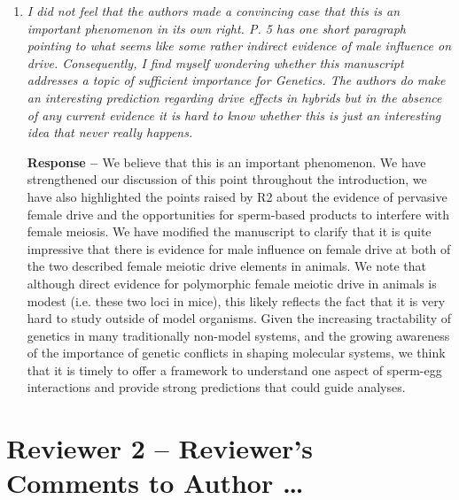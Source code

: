 \documentclass[12pt,letterpaper]{article}
\begin{document}
\begin{enumerate}
\item
\begin{singlespace}
\emph{I did not feel that the authors made a convincing case that this is an
important phenomenon in its own right.  P. 5 has one short paragraph pointing to
what seems like some rather indirect evidence of male influence on drive.
Consequently, I find myself wondering whether this manuscript addresses a topic
of sufficient importance for Genetics.  The authors do make an interesting
prediction regarding drive effects in hybrids but in the absence of any current
evidence it is hard to know whether this is just an interesting idea that never
really happens.} \\
\end{singlespace}

\begin{singlespace}
	{\bf{Response -- }}  We believe that this is an important
        phenomenon. We have strengthened our discussion of this point
        throughout the introduction,
        we have also highlighted the points raised by R2 about 
        the evidence of pervasive female drive and the opportunities for
        sperm-based products
        to interfere with female meiosis.
	We have modified the manuscript to clarify that it is quite impressive that there is evidence
	for male influence on female drive at both of the two described
        female meiotic drive elements in animals. 
	We note that although direct evidence for polymorphic female meiotic drive
        in animals is modest (i.e. these two loci in mice), 
	this likely reflects the fact that it is very hard to study
        outside of model organisms. 
Given the increasing tractability of genetics in many traditionally
        non-model systems, and the growing awareness of the importance
        of genetic conflicts in shaping molecular systems, we think
        that it is timely to offer a framework to understand one
        aspect of sperm-egg 
        interactions and provide
strong predictions that could guide analyses.
\end{singlespace}
\end{enumerate}

\newpage

\section*{Reviewer 2 -- Reviewer's Comments to Author \dots}
\end{document}
